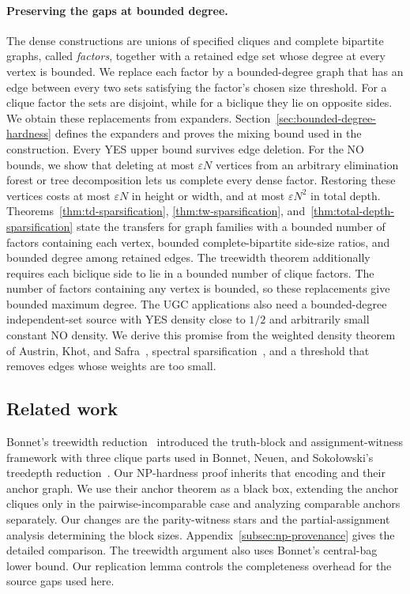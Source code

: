 \paragraph{Preserving the gaps at bounded degree.}
The dense constructions are unions of specified cliques and
complete bipartite graphs, called \emph{factors}, together with a
retained edge set whose degree at every vertex is bounded. We replace each factor by a
bounded-degree graph that has an edge between every two sets satisfying
the factor's chosen size threshold. For a clique factor the sets are
disjoint, while for a biclique they lie on opposite sides. We obtain
these replacements from expanders. Section~\ref{sec:bounded-degree-hardness}
defines the expanders and proves the mixing bound used in the construction.
Every YES upper bound survives edge deletion.
For the NO bounds, we show that deleting at most $\varepsilon N$
vertices from an arbitrary elimination forest or tree decomposition
lets us complete every dense factor. Restoring these vertices costs
at most $\varepsilon N$ in height or width, and at most
$\varepsilon N^2$ in total depth.
Theorems~\ref{thm:td-sparsification}, \ref{thm:tw-sparsification},
and~\ref{thm:total-depth-sparsification} state the transfers for
graph families with a bounded number of factors containing each
vertex, bounded complete-bipartite
side-size ratios, and bounded degree among retained edges. The
treewidth theorem additionally requires each biclique side to
lie in a bounded number of clique factors.
The number of factors containing any vertex is bounded, so these
replacements give bounded maximum degree. The \textup{UGC} applications also
need a bounded-degree independent-set source with YES density close
to $1/2$ and arbitrarily small constant NO density. We derive this
promise from the weighted density theorem of Austrin, Khot, and
Safra~\cite{AKS2011}, spectral sparsification~\cite{BSS2012}, and
a threshold that removes edges whose weights are too small.

\subsection{Related work}

Bonnet's treewidth reduction~\cite{BonnetTreewidth} introduced the
truth-block and assignment-witness framework with three clique parts
used in Bonnet, Neuen, and Soko\l owski's treedepth reduction~\cite{BNS}.
Our \textup{NP}-hardness proof inherits that encoding and their anchor graph.
We use their anchor theorem as a
black box, extending the anchor cliques only in the pairwise-incomparable
case and analyzing comparable anchors separately. Our changes are the
parity-witness stars and the partial-assignment analysis determining
the block sizes. Appendix~\ref{subsec:np-provenance} gives the detailed
comparison. The treewidth argument also uses Bonnet's central-bag
lower bound. Our replication lemma controls
the completeness overhead for the source gaps used here.

